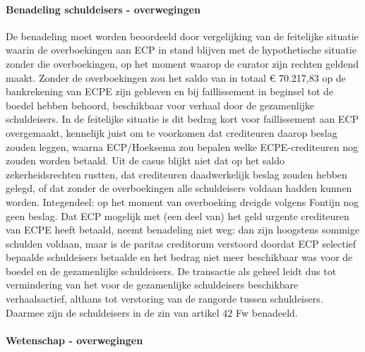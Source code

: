 \documentclass[
  dutch,
  a4paper,
]{article}
\begin{document}
\paragraph{Benadeling schuldeisers - overwegingen}\label{benadeling-schuldeisers---overwegingen-49}

De benadeling moet worden beoordeeld door vergelijking van de feitelijke situatie waarin de overboekingen aan ECP in stand blijven met de hypothetische situatie zonder die overboekingen, op het moment waarop de curator zijn rechten geldend maakt. Zonder de overboekingen zou het saldo van in totaal € 70.217,83 op de bankrekening van ECPE zijn gebleven en bij faillissement in beginsel tot de boedel hebben behoord, beschikbaar voor verhaal door de gezamenlijke schuldeisers. In de feitelijke situatie is dit bedrag kort voor faillissement aan ECP overgemaakt, kennelijk juist om te voorkomen dat crediteuren daarop beslag zouden leggen, waarna ECP/Hoeksema zou bepalen welke ECPE-crediteuren nog zouden worden betaald. Uit de casus blijkt niet dat op het saldo zekerheidsrechten rustten, dat crediteuren daadwerkelijk beslag zouden hebben gelegd, of dat zonder de overboekingen alle schuldeisers voldaan hadden kunnen worden. Integendeel: op het moment van overboeking dreigde volgens Fontijn nog geen beslag. Dat ECP mogelijk met (een deel van) het geld urgente crediteuren van ECPE heeft betaald, neemt benadeling niet weg: dan zijn hoogstens sommige schulden voldaan, maar is de paritas creditorum verstoord doordat ECP selectief bepaalde schuldeisers betaalde en het bedrag niet meer beschikbaar was voor de boedel en de gezamenlijke schuldeisers. De transactie als geheel leidt dus tot vermindering van het voor de gezamenlijke schuldeisers beschikbare verhaalsactief, althans tot verstoring van de rangorde tussen schuldeisers. Daarmee zijn de schuldeisers in de zin van artikel 42 Fw benadeeld.

\paragraph{Wetenschap - overwegingen}\label{wetenschap---overwegingen-49}
\end{document}
